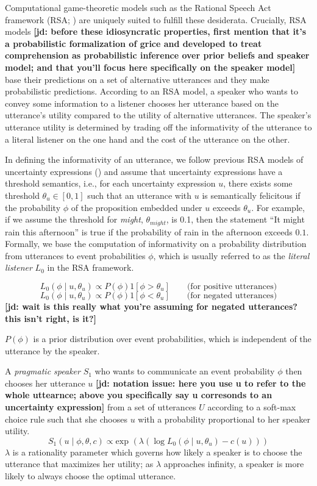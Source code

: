 \documentclass[lucida,biblatex]{sp} %
\renewcommand{\exp}{\text{exp }}
\newcommand{\jd}[1]{\textcolor{PinkyPurple}{\textbf{[jd: #1]}}}
\begin{document}
Computational game-theoretic models such as the Rational Speech Act 
framework (RSA; \cite{Goodman2016})  are uniquely suited to fulfill these desiderata.
Crucially, RSA models \jd{before these idiosyncratic properties, first mention that it's a probabilistic formalization of grice and developed to treat comprehension as probabilistic inference over prior beliefs and speaker model; and that you'll focus here specifically on the speaker model}  base their predictions on a set of alternative utterances and 
they make probabilistic predictions.  According to an RSA model, a speaker who wants to
 convey some information to a listener 
chooses her utterance based on the utterance's utility compared to the utility of alternative utterances. 
The speaker's utterance utility  is determined by trading off the informativity of the utterance to a literal listener on the one hand and the cost of the utterance on the other.

In defining the informativity of an utterance, we follow previous RSA models of uncertainty expressions (\cite{Lassiter2013,Herbstritt2019}) 
and assume that uncertainty expressions have a threshold semantics, 
i.e., for each uncertainty expression $u$, there exists some threshold $\theta_u \in [0,1]$ 
such that an utterance with $u$ is semantically felicitous if the probability $\phi$ 
of the proposition embedded under $u$ exceeds $\theta_u$. 
For example, if we assume the threshold for \textit{might}, $\theta_{might}$, is 0.1, then the statement 
``It might rain this afternoon'' is true if the probability of rain in the afternoon exceeds $0.1$. 
Formally, we base the computation of informativity on a probability distribution from utterances to event probabilities $\phi$, 
which is usually referred to as the \textit{literal listener} $L_0$ in the RSA framework. 

$$L_0\left(\phi \mid u, \theta_u\right) \propto P(\phi) 1\left[\phi > \theta_u \right] \qquad \mbox{(for positive utterances)}$$
$$L_0\left(\phi \mid u, \theta_u\right) \propto P(\phi) 1\left[\phi < \theta_u \right] \qquad \mbox{(for negated utterances)}$$ \jd{wait is this really what you're assuming for negated utterances? this isn't right, is it?}

$P(\phi)$ is a prior distribution over event probabilities, which is independent of the utterance by the speaker.


A \textit{pragmatic speaker} $S_1$ who wants to communicate an event probability $\phi$ then chooses her utterance $u$ \jd{notation issue: here you use u to refer to the whole uttearnce; above you specifically say u corresonds to an uncertainty expression} from a set of utterances $U$ according to a soft-max choice rule \cite{Luce1959,SuttonBarto} such that she chooses $u$ with a probability proportional to her speaker utility. 
$$S_1\left(u \mid \phi, \theta, c\right) \propto \exp \left( \lambda \left( \log L_0\left(\phi \mid u, \theta_u\right)  - c(u)\right)\right)$$
$\lambda$ is a rationality parameter which governs how likely a speaker is to choose the utterance that maximizes her utility; as $\lambda$ approaches infinity, a speaker is more likely to always choose the optimal utterance.  
\end{document}
